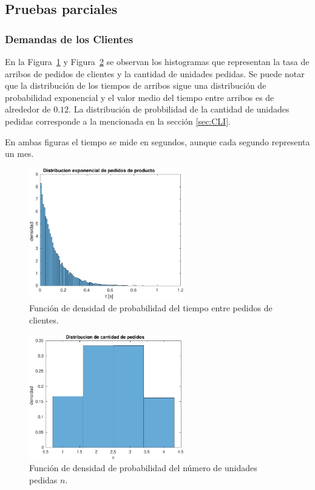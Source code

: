 \documentclass[10pt]{article}
\begin{document}
\subsection{Pruebas parciales}


 
\subsubsection{Demandas de los Clientes} 
 
En la Figura~\ref{fig:pdftiempo} y Figura~\ref{fig:pdfpedidos} se observan los histogramas que representan la tasa de arribos de pedidos de clientes y la cantidad de unidades pedidas. Se puede notar que la distribución de los tiempos de arribos sigue una distribución de probabilidad exponencial y el valor medio del tiempo entre arribos es de alrededor de $0.12$. La distribución de probbilidad de la cantidad de unidades pedidas corresponde a la mencionada en la sección \ref{sec:CLI}. 

En ambas figuras el tiempo se mide en segundos, aunque cada segundo representa un mes. 
 
\begin{figure} 
\centering 
\includegraphics[width=0.6\textwidth]{img/pdf_tiempo_pedidos} 
\caption{Función de densidad de probabilidad del tiempo entre pedidos de clientes.} 
\label{fig:pdftiempo} 
\end{figure} 
 
\begin{figure} 
\centering 
\includegraphics[width=0.6\textwidth]{img/pdf_cantidad_pedidos} 
\caption{Función de densidad de probabilidad del número de unidades pedidas $n$.} 
\label{fig:pdfpedidos} 
\end{figure}
\FloatBarrier
\end{document}

